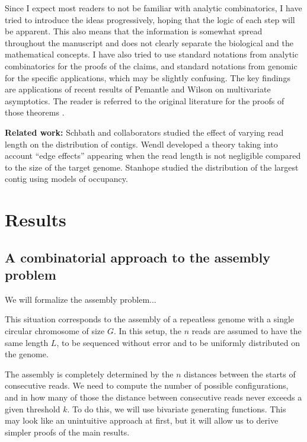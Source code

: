 \documentclass{article}
\begin{document}
Since I expect most readers to not be familiar with analytic
combinatorics, I have tried to introduce the ideas progressively, hoping
that the logic of each step will be apparent. This also means that the
information is somewhat spread throughout the manuscript and does not
clearly separate the biological and the mathematical concepts. I have also
tried to use standard notations from analytic combinatorics for the proofs
of the claims, and standard notations from genomic for the specific
applications, which may be slightly confusing.  The key findings are
applications of recent results of Pemantle and Wilson on multivariate
asymptotics. The reader is referred to the original literature for the
proofs of those theorems \cite{PemWil08,AnalComb2013}.

\textbf{Related work:} Schbath and collaborators \cite{pmid10890387}
studied the effect of varying read length on the distribution of contigs.
Wendl \cite{pmid16901236} developed a theory taking into account ``edge
effects'' appearing when the read length is not negligible compared to the
size of the target genome. Stanhope \cite{pmid20686599} studied the
distribution of the largest contig using models of occupancy.


\section{Results}

\subsection{A combinatorial approach to the assembly problem}

We will formalize the assembly problem...

This situation corresponds to the assembly of a repeatless genome with a
single circular chromosome of size $G$. In this setup, the $n$ reads are
assumed to have the same length $L$, to be sequenced without error  and to
be uniformly distributed on the genome.

The assembly is completely determined by the $n$ distances between the
starts of consecutive reads. We need to compute the number of possible
configurations, and in how many of those the distance between consecutive
reads never exceeds a given threshold $k$. To do this, we will use
bivariate generating functions. This may look like an unintuitive approach
at first, but it will allow us to derive simpler proofs of the main
results.
\end{document}
